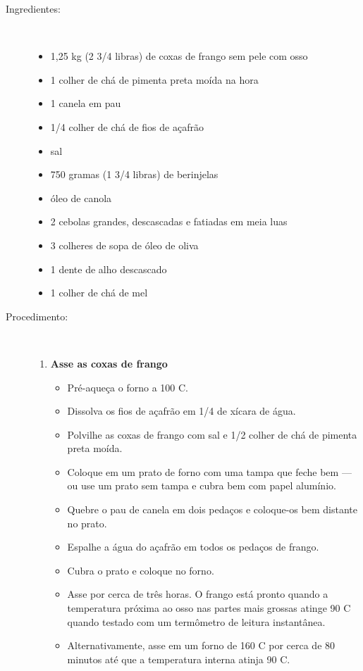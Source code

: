 \documentclass [11pt, papel de carta] {article}
\begin{document}
\begin {description}

\item [Ingredientes:] \ \\
\begin {itemize}
\item 1,25 kg (2 3/4 libras) de coxas de frango sem pele com osso
\item 1 colher de chá de pimenta preta moída na hora
\item 1 canela em pau
\item 1/4 colher de chá de fios de açafrão
\item sal
\item 750 gramas (1 3/4 libras) de berinjelas
\item óleo de canola
\item 2 cebolas grandes, descascadas e fatiadas em meia luas
\item 3 colheres de sopa de óleo de oliva
\item 1 dente de alho descascado
\item 1 colher de chá de mel
\end {itemize}
\item [Procedimento:] \ \\
\begin {enumerate}
\item {\bf Asse as coxas de frango}
\begin {itemize}
\item Pré-aqueça o forno a 100 C.
\item Dissolva os fios de açafrão em 1/4 de xícara de água.
\item Polvilhe as coxas de frango com sal e 1/2 colher de chá de pimenta preta moída.
\item Coloque em um prato de forno com uma tampa que feche bem --- ou use um prato sem tampa e cubra bem com papel alumínio.
\item Quebre o pau de canela em dois pedaços e coloque-os bem distante no prato.
\item Espalhe a água do açafrão em todos os pedaços de frango.
\item Cubra o prato e coloque no forno.
\item Asse por cerca de três horas. O frango est\'a pronto quando a temperatura próxima ao osso nas partes mais grossas atinge 90 C quando testado com um termômetro de leitura instantânea.
\item Alternativamente, asse em um forno de 160 C por cerca de 80 minutos até que a temperatura interna atinja 90 C.

\end{itemize}
\end{enumerate}
\end{description}
\end{document}
